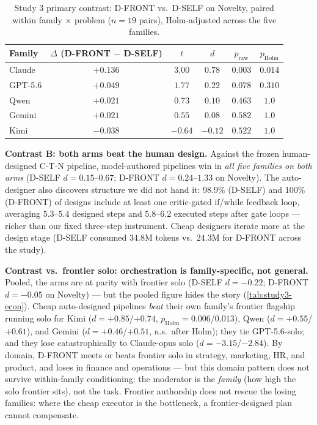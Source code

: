 \documentclass[12pt,a4paper]{article}
\begin{document}
\begin{table}[ht]
  \centering
  \caption{Study 3 primary contrast: D-FRONT vs.\ D-SELF on Novelty, paired
  within family $\times$ problem ($n = 19$ pairs), Holm-adjusted across the
  five families.}
  \label{tab:study3-authorship}
  \begin{tabular}{@{}l c c c c c@{}}
    \toprule
    \textbf{Family} & $\Delta$ (D-FRONT $-$ D-SELF) & $t$ & $d$ &
      $p_{\text{raw}}$ & $p_{\text{Holm}}$ \\
    \midrule
    Claude & $+0.136$ & $3.00$ & $0.78$ & $0.003$ & $\mathbf{0.014}$ \\
    GPT-5.6 & $+0.049$ & $1.77$ & $0.22$ & $0.078$ & $0.310$ \\
    Qwen & $+0.021$ & $0.73$ & $0.10$ & $0.463$ & $1.0$ \\
    Gemini & $+0.021$ & $0.55$ & $0.08$ & $0.582$ & $1.0$ \\
    Kimi & $-0.038$ & $-0.64$ & $-0.12$ & $0.522$ & $1.0$ \\
    \bottomrule
  \end{tabular}
\end{table}

\textbf{Contrast B: both arms beat the human design.} Against the frozen
human-designed C-T-N pipeline, model-authored pipelines win in \emph{all five
families on both arms} (D-SELF $d = 0.15$--$0.67$; D-FRONT $d = 0.24$--$1.33$
on Novelty). The auto-designer also discovers structure we did not hand it:
98.9\% (D-SELF) and 100\% (D-FRONT) of designs include at least one
critic-gated if/while feedback loop, averaging $5.3$--$5.4$ designed steps and
$5.8$--$6.2$ executed steps after gate loops --- richer than our fixed
three-step instrument. Cheap designers iterate more at the design stage
(D-SELF consumed $34.8$M tokens vs.\ $24.3$M for D-FRONT across the study).

\textbf{Contrast vs.\ frontier solo: orchestration is family-specific, not
general.} Pooled, the arms are at parity with frontier solo (D-SELF
$d = -0.22$; D-FRONT $d = -0.05$ on Novelty) --- but the pooled figure hides
the story (\cref{tab:study3-econ}). Cheap auto-designed pipelines \emph{beat}
their own family's frontier flagship running solo for Kimi
($d = +0.85$/$+0.74$, $p_{\text{Holm}} = 0.006$/$0.013$), Qwen
($d = +0.55$/$+0.61$), and Gemini ($d = +0.46$/$+0.51$, n.s.\ after Holm);
they tie GPT-5.6-solo; and they lose catastrophically to Claude-opus solo
($d = -3.15$/$-2.84$). By domain, D-FRONT meets or beats frontier solo in
strategy, marketing, HR, and product, and loses in finance and operations ---
but this domain pattern does not survive within-family conditioning: the
moderator is the \emph{family} (how high the solo frontier sits), not the
task. Frontier authorship does not rescue the losing families: where the cheap
executor is the bottleneck, a frontier-designed plan cannot compensate.
\end{document}
